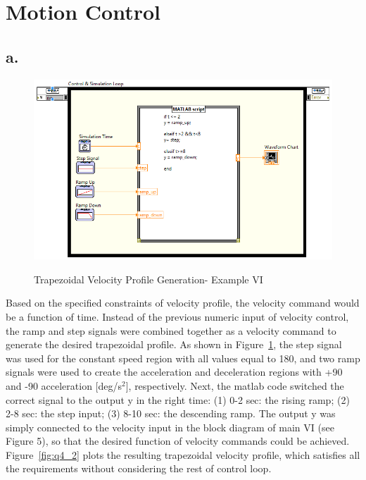\documentclass{article}
\theoremstyle{plain}
\theoremstyle{definition}
\theoremstyle{remark}
\begin{document}
\section{Motion Control}
\subsection*{a.}

\begin{figure}[h!]
\begin{center}
\includegraphics[width=16cm]{Q4_CommandGeneration_VI.png}
\caption{Trapezoidal Velocity Profile Generation- Example VI} \label{tex}
\label{fig:q4_1}
\end{center}
\end{figure}

Based on the specified constraints of velocity profile, the velocity command would be a function of time. Instead of the previous numeric input of velocity control, the ramp and step signals were combined together as a velocity command to generate the desired trapezoidal profile. As shown in Figure~\ref{fig:q4_1}, the step signal was used for the constant speed region with all values equal to 180, and two ramp signals were used to create the acceleration and deceleration regions with +90 and -90 acceleration [deg/s$^{2}$], respectively. Next, the matlab code switched the correct signal to the output y in the right time: (1) 0-2 sec: the rising ramp; (2) 2-8 sec: the step input; (3) 8-10 sec: the descending ramp. The output y was simply connected to the velocity input in the block diagram of main VI (see Figure 5), so that the desired function of velocity commands could be achieved. Figure~\ref{fig:q4_2} plots the resulting trapezoidal velocity profile, which satisfies all the requirements without considering the rest of control loop.\\
\end{document}
